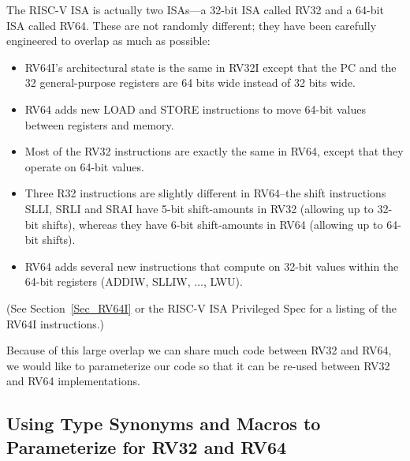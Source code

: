 \label{BSV_Paramterizing_XLEN}


The RISC-V ISA is actually two ISAs---a 32-bit ISA called RV32 and a
64-bit ISA called RV64.  These are not randomly different; they have
been carefully engineered to overlap as much as possible:

\begin{itemize}

 \item RV64I's architectural state is the same in RV32I except that
       the PC and the 32 general-purpose registers are 64 bits wide
       instead of 32 bits wide.

 \item RV64 adds new LOAD and STORE instructions to move 64-bit values
       between registers and memory.

 \item Most of the RV32 instructions are exactly the same in RV64,
       except that they operate on 64-bit values.


 \item Three R32 instructions are slightly different in RV64--the
       shift instructions SLLI, SRLI and SRAI have 5-bit shift-amounts
       in RV32 (allowing up to 32-bit shifts), whereas they have 6-bit
       shift-amounts in RV64 (allowing up to 64-bit shifts).

 \item RV64 adds several new instructions that compute on 32-bit
       values within the 64-bit registers (ADDIW, SLLIW, ..., LWU).

\end{itemize}

(See Section~\ref{Sec_RV64I} or the RISC-V ISA Privileged Spec for a
listing of the RV64I instructions.)

Because of this large overlap we can share much {\BSV} code between
RV32 and RV64, {\ie} we would like to parameterize our {\BSV} code so
that it can be re-used between RV32 and RV64 implementations.


\subsection{Using Type Synonyms and Macros to Parameterize for RV32 and RV64}

\label{Sec_Type_Synonums_and_Macros}

